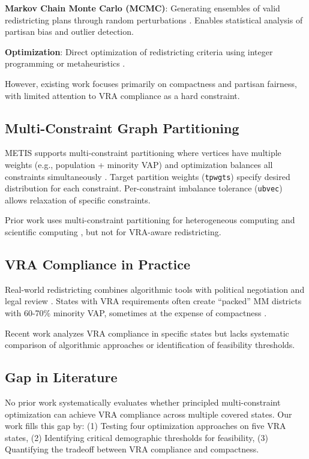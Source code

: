 \textbf{Markov Chain Monte Carlo (MCMC)}: Generating ensembles of valid redistricting plans through random perturbations \citep{duchin2018, deford2021}. Enables statistical analysis of partisan bias and outlier detection.

\textbf{Optimization}: Direct optimization of redistricting criteria using integer programming \citep{hess1965, shirabe2005} or metaheuristics \citep{bacao2005}.

However, existing work focuses primarily on compactness and partisan fairness, with limited attention to VRA compliance as a hard constraint.

\subsection{Multi-Constraint Graph Partitioning}

METIS supports multi-constraint partitioning where vertices have multiple weights (e.g., population + minority VAP) and optimization balances all constraints simultaneously \citep{karypis1998metis}. Target partition weights (\texttt{tpwgts}) specify desired distribution for each constraint. Per-constraint imbalance tolerance (\texttt{ubvec}) allows relaxation of specific constraints.

Prior work uses multi-constraint partitioning for heterogeneous computing \citep{catalyurek2011} and scientific computing \citep{hendrickson2000}, but not for VRA-aware redistricting.

\subsection{VRA Compliance in Practice}

Real-world redistricting combines algorithmic tools with political negotiation and legal review \citep{pildes2002}. States with VRA requirements often create ``packed'' MM districts with 60-70\% minority VAP, sometimes at the expense of compactness \citep{lublin1997}.

Recent work \citep{duchin2020alabama, chen2020texas} analyzes VRA compliance in specific states but lacks systematic comparison of algorithmic approaches or identification of feasibility thresholds.

\subsection{Gap in Literature}

No prior work systematically evaluates whether principled multi-constraint optimization can achieve VRA compliance across multiple covered states. Our work fills this gap by:
(1) Testing four optimization approaches on five VRA states,
(2) Identifying critical demographic thresholds for feasibility,
(3) Quantifying the tradeoff between VRA compliance and compactness.
